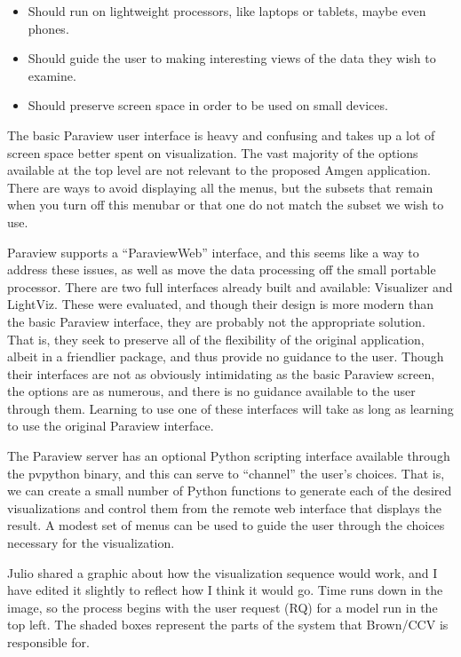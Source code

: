\documentclass[11pt]{tsmemo}
\begin{document}
\begin{memo}
\begin{itemize}
\item Should run on lightweight processors, like laptops or tablets,
  maybe even phones.

\item Should guide the user to making interesting views of the data
  they wish to examine.

\item Should preserve screen space in order to be used on small devices.

\end{itemize}

The basic Paraview user interface is heavy and confusing and takes up
a lot of screen space better spent on visualization. The vast majority
of the options available at the top level are not relevant to the
proposed Amgen application.  There are ways to avoid displaying all
the menus, but the subsets that remain when you turn off this menubar
or that one do not match the subset we wish to use.

Paraview supports a ``ParaviewWeb'' interface, and this seems like a
way to address these issues, as well as move the data processing off
the small portable processor.  There are two full interfaces already
built and available: Visualizer and LightViz.  These were evaluated,
and though their design is more modern than the basic Paraview
interface, they are probably not the appropriate solution.  That is,
they seek to preserve all of the flexibility of the original
application, albeit in a friendlier package, and thus provide no
guidance to the user.  Though their interfaces are not as obviously
intimidating as the basic Paraview screen, the options are as
numerous, and there is no guidance available to the user through them.
Learning to use one of these interfaces will take as long as learning
to use the original Paraview interface.

The Paraview server has an optional Python scripting interface
available through the pvpython binary, and this can
serve to ``channel'' the user's choices.  That is, we can create a
small number of Python functions to generate each of the desired
visualizations and control them from the remote web interface that
displays the result.  A modest set of menus can be used to guide the
user through the choices necessary for the visualization.

Julio shared a graphic about how the visualization sequence would
work, and I have edited it slightly to reflect how I think it would
go.  Time runs down in the image, so the process begins with the user
request (RQ) for a model run in the top left.  The shaded boxes
represent the parts of the system that Brown/CCV is responsible for.


\end{memo}
\end{document}
